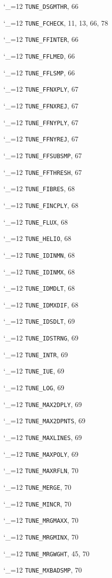 \documentclass[11pt,twoside]{article}
\newcommand{\cmdname}{\begingroup \catcode`\_=12 \realcmdname}
\newcommand{\realcmdname}[1]{\endgroup\texttt{#1}}
\begin{document}
\begin{theindex}
  \item \cmdname {TUNE_DSGMTHR}, 66
  \item \cmdname {TUNE_FCHECK}, 11, 13, 66, 78
  \item \cmdname {TUNE_FFINTER}, 66
  \item \cmdname {TUNE_FFLMED}, 66
  \item \cmdname {TUNE_FFLSMP}, 66
  \item \cmdname {TUNE_FFNXPLY}, 67
  \item \cmdname {TUNE_FFNXREJ}, 67
  \item \cmdname {TUNE_FFNYPLY}, 67
  \item \cmdname {TUNE_FFNYREJ}, 67
  \item \cmdname {TUNE_FFSUBSMP}, 67
  \item \cmdname {TUNE_FFTHRESH}, 67
  \item \cmdname {TUNE_FIBRES}, 68
  \item \cmdname {TUNE_FINCPLY}, 68
  \item \cmdname {TUNE_FLUX}, 68
  \item \cmdname {TUNE_HELIO}, 68
  \item \cmdname {TUNE_IDINMN}, 68
  \item \cmdname {TUNE_IDINMX}, 68
  \item \cmdname {TUNE_IDMDLT}, 68
  \item \cmdname {TUNE_IDMXDIF}, 68
  \item \cmdname {TUNE_IDSDLT}, 69
  \item \cmdname {TUNE_IDSTRNG}, 69
  \item \cmdname {TUNE_INTR}, 69
  \item \cmdname {TUNE_IUE}, 69
  \item \cmdname {TUNE_LOG}, 69
  \item \cmdname {TUNE_MAX2DPLY}, 69
  \item \cmdname {TUNE_MAX2DPNTS}, 69
  \item \cmdname {TUNE_MAXLINES}, 69
  \item \cmdname {TUNE_MAXPOLY}, 69
  \item \cmdname {TUNE_MAXRFLN}, 70
  \item \cmdname {TUNE_MERGE}, 70
  \item \cmdname {TUNE_MINCR}, 70
  \item \cmdname {TUNE_MRGMAXX}, 70
  \item \cmdname {TUNE_MRGMINX}, 70
  \item \cmdname {TUNE_MRGWGHT}, 45, 70
  \item \cmdname {TUNE_MXBADSMP}, 70

\end{theindex}
\end{document}
